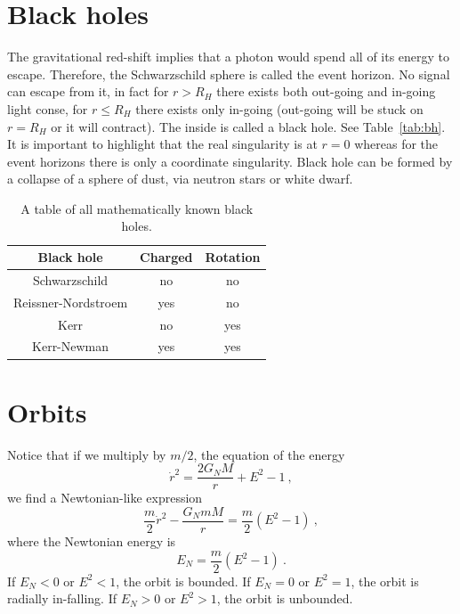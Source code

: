 \section{Black holes}

    The gravitational red-shift implies that a photon would spend all of its energy to escape. Therefore, the Schwarzschild sphere is called the event horizon. No signal can escape from it, in fact for $r > R_H$ there exists both out-going and in-going light conse, for $r \leq R_H$ there exists only in-going (out-going will be stuck on $r=R_H$ or it will contract). The inside is called a black hole. See Table~\eqref{tab:bh}. It is important to highlight that the real singularity is at $r=0$ whereas for the event horizons there is only a coordinate singularity. Black hole can be formed by a collapse of a sphere of dust, via neutron stars or white dwarf.

    \begin{table}[h!]
        \centering
        \begin{tabular}{c | c | c}
            Black hole & Charged & Rotation\\
            \hline
            Schwarzschild & no & no \\
            Reissner-Nordstroem & yes & no \\
            Kerr & no & yes \\
            Kerr-Newman & yes & yes \\
        \end{tabular}
        \caption{A table of all mathematically known black holes.}
        \label{tab:bh}
    \end{table}

\section{Orbits}

    Notice that if we multiply by $m/2$, the equation of the energy
    \begin{equation*}
        \dot r^2 = \frac{2G_N M}{r} + E^2 -1 ~,
    \end{equation*}
    we find a Newtonian-like expression
    \begin{equation*}
        \frac{m}{2} \dot r^2 - \frac{G_N m M}{r} = \frac{m}{2} (E^2 - 1) ~,
    \end{equation*}
    where the Newtonian energy is 
    \begin{equation*}
        E_N = \frac{m}{2} (E^2 - 1) ~.
    \end{equation*}
    If $E_N < 0$ or $E^2 < 1$, the orbit is bounded. If $E_N = 0$ or $E^2 = 1$, the orbit is radially in-falling. If $E_N > 0$ or $E^2 > 1$, the orbit is unbounded. 

